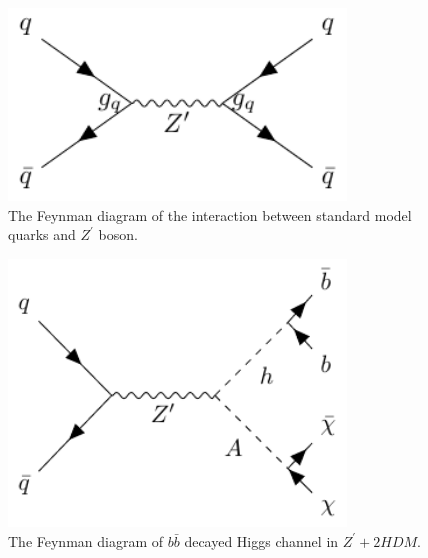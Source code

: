 \begin{figure}[htbp]
  \begin{center}
    \includegraphics[width=0.8\textwidth]{chapters/c2/figures/z-prime}
  \end{center}
  \caption{The Feynman diagram of the interaction between standard model quarks and $Z^{\prime}$ boson.}
  \label{fig:c2zprime}
\end{figure}

\begin{figure}[htbp]
  \begin{center}
    \includegraphics[width=0.8\textwidth]{chapters/c2/figures/z-prime-2hdm}
  \end{center}
  \caption{The Feynman diagram of $b\bar{b}$ decayed Higgs channel in $Z^{\prime}+2HDM$.}
  \label{fig:c2zprime2hdm}
\end{figure}

